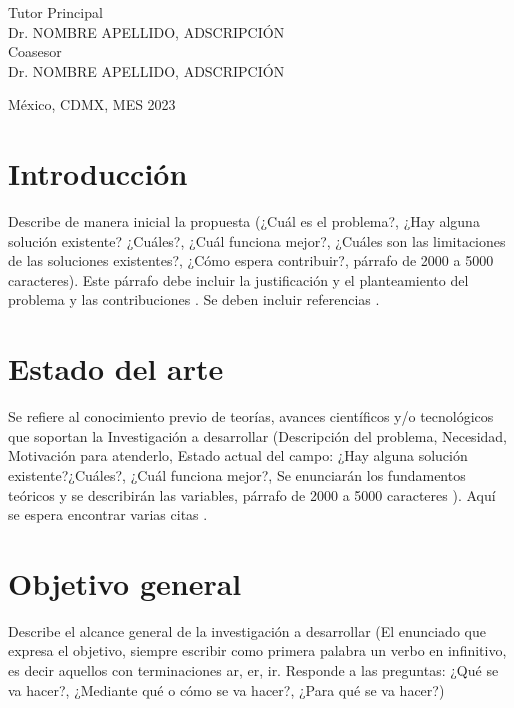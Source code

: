 \documentclass[letterpaper,12pt,oneside]{article}
\begin{document}
\begin{titlepage}
\begin{center}
\begin{center}
				\bigskip
				
				Tutor Principal\\
				Dr. NOMBRE APELLIDO, ADSCRIPCIÓN\\
				Coasesor \\
                		Dr. NOMBRE APELLIDO, ADSCRIPCIÓN\\
			\end{center}
			
			\vfill
			
			\begin{center}
				{México, CDMX, MES 2023}\\
			\end{center}
			\cleardoublepage
		\end{center}
	\end{titlepage}
 
\clearpage
    

\section{Introducción} 

Describe de manera inicial la propuesta (¿Cuál es el problema?, ¿Hay alguna solución existente? ¿Cuáles?, ¿Cuál funciona mejor?, ¿Cuáles son las limitaciones de las soluciones existentes?, ¿Cómo espera contribuir?, párrafo de 2000 a 5000 caracteres). Este párrafo debe incluir la justificación y el planteamiento del problema y las contribuciones \cite{phil99}. Se deben incluir referencias \cite{smit54, jame76}.

\section{Estado del arte}
Se refiere al conocimiento previo de teorías, avances científicos y/o tecnológicos que soportan la Investigación a desarrollar (Descripción del problema, Necesidad, Motivación para atenderlo, Estado actual del campo: ¿Hay alguna solución existente?¿Cuáles?, ¿Cuál funciona mejor?, Se enunciarán los fundamentos teóricos y se describirán las variables, párrafo de 2000 a 5000 caracteres \cite{gree00}). Aquí se espera encontrar varias citas \cite{colu92}. 

\section{Objetivo general}
Describe el alcance general de la investigación a desarrollar (El enunciado que expresa el objetivo, siempre escribir como primera palabra un verbo en infinitivo, es decir aquellos con terminaciones ar, er, ir. Responde a las preguntas: ¿Qué se va hacer?, ¿Mediante qué o cómo se va hacer?, ¿Para qué se va hacer?)
\end{document}
